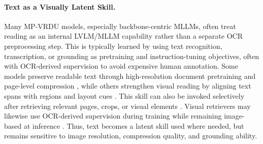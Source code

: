 \documentclass[11pt]{article}
\begin{document}

\paragraph{Text as a Visually Latent Skill.}
Many MP-VRDU models, especially backbone-centric MLLMs, often treat reading as an internal LVLM/MLLM capability rather than a separate OCR preprocessing step. This is typically learned by using text recognition, transcription, or grounding as pretraining and instruction-tuning objectives, often with OCR-derived supervision to avoid expensive human annotation. Some models preserve readable text through high-resolution document pretraining and page-level compression \cite{hu2025mplug}, while others strengthen visual reading by aligning text spans with regions and layout cues \cite{yu2024texthawk2}. This skill can also be invoked selectively after retrieving relevant pages, crops, or visual elements \cite{zheng2026doc, jain2025simpledoc}. Visual retrievers may likewise use OCR-derived supervision during training while remaining image-based at inference \cite{tanaka2025vdocrag}. Thus, text becomes a latent skill used where needed, but remains sensitive to image resolution, compression quality, and grounding ability.
\end{document}
